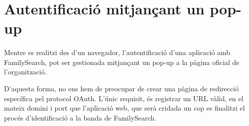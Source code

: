 \section{Autentificació mitjançant un pop-up}

    \paragraph{}
    Mentre es realitzi des d'un navegador, l'autentificació d’una aplicació amb FamilySearch, pot ser gestionada mitjançant un pop-up a la pàgina oficial de l’organització.

    D'aquesta forma, no ens hem de preocupar de crear una pàgina de redirecció específica pel protocol OAuth. L'únic requisit, és registrar un URL vàlid, en el mateix domini i port que l’aplicació web, que serà cridada un cop es finalitzi el procés d'identificació a la banda de FamilySearch.
